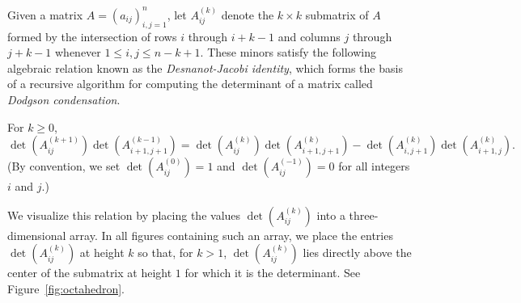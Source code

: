 \documentclass[11pt]{article}
\theoremstyle{definition}
\numberwithin{equation}{section}
\numberwithin{equation}{section}
\begin{document}
Given a matrix $A=(a_{ij})_{i,j=1}^{n}$, let $A_{ij}^{(k)}$ denote the $k \times k$ submatrix of $A$ formed by the intersection of rows $i$ through $i+k-1$ and columns $j$ through $j+k-1$ whenever $1 \leq i,j \leq n-k+1$. These minors satisfy the following algebraic relation known as the \emph{Desnanot-Jacobi identity}, which forms the basis of a recursive algorithm for computing the determinant of a matrix called \emph{Dodgson condensation}.

\begin{Prop} \label{prop:dodgson}
For $k \geq 0$,
\[\det(A_{ij}^{(k+1)}) \det(A_{i+1,j+1}^{(k-1)})=\det(A_{ij}^{(k)})\det(A_{i+1,j+1}^{(k)})-\det(A_{i,j+1}^{(k)})\det(A_{i+1,j}^{(k)}).\]
(By convention, we set $\det(A_{ij}^{(0)})=1$ and $\det(A_{ij}^{(-1)})=0$ for all integers $i$ and $j$.)
\end{Prop}

We visualize this relation by placing the values $\det(A_{ij}^{(k)})$ into a three-dimensional array. In all figures containing such an array, we place the entries $\det(A_{ij}^{(k)})$ at height $k$ so that, for $k>1$, $\det(A_{ij}^{(k)})$ lies directly above the center of the submatrix at height $1$ for which it is the determinant. See Figure~\ref{fig:octahedron}.







\end{document}
